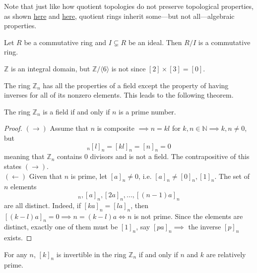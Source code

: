   Note that just like how quotient topologies do not preserve topological properties, as shown \hyperref[pst-quotient_trivial]{here} and \hyperref[pst-quotient_hausdorff]{here}, quotient rings inherit some---but not all---algebraic properties. 

  \begin{theorem}
    Let $R$ be a commutative ring and $I \subsetneq R$ be an ideal. Then $R/I$ is a commutative ring. 
  \end{theorem}

  \begin{example}
    $\mathbb{Z}$ is an integral domain, but $\mathbb{Z}/\langle 6 \rangle$ is not since $[2] \times [3] = [0]$. 
  \end{example}


  The ring $\mathbb{Z}_n$ has all the properties of a field except the property of having inverses for all of its nonzero elements. This leads to the following theorem. 

  \begin{theorem}
    The ring $\mathbb{Z}_{n}$ is a field if and only if $n$ is a prime number. 
  \end{theorem}
  \begin{proof}
    $(\rightarrow)$ Assume that $n$ is composite $\implies n = k l$ for $k, n \in \mathbb{N} \implies k, n \neq 0$, but 
    \begin{equation}
      [k]_n [l]_n = [k l]_n = [n]_n = 0
    \end{equation}
    meaning that $\mathbb{Z}_n$ contains $0$ divisors and is not a field. The contrapositive of this states $(\rightarrow)$. \\
    $(\leftarrow)$ Given that $n$ is prime, let $[a]_n \neq 0$, i.e. $[a]_n \neq [0]_n, [1]_n$. The set of $n$ elements 
    \begin{equation}
      [0]_n, [a]_n, [2a]_n, ..., [(n-1)a]_n
    \end{equation}
    are all distinct. Indeed, if $[k a]_n = [l a]_n$, then $[(k-l) a]_n = 0 \implies n = (k-l) a \iff n$ is not prime. Since the elements are distinct, exactly one of them must be $[1]_n$, say $[p a]_n \implies$ the inverse $[p]_n$ exists. 
  \end{proof}

  \begin{corollary}
    For any $n$, $[k]_n$ is invertible in the ring $\mathbb{Z}_n$ if and only if $n$ and $k$ are relatively prime. 
  \end{corollary} 

